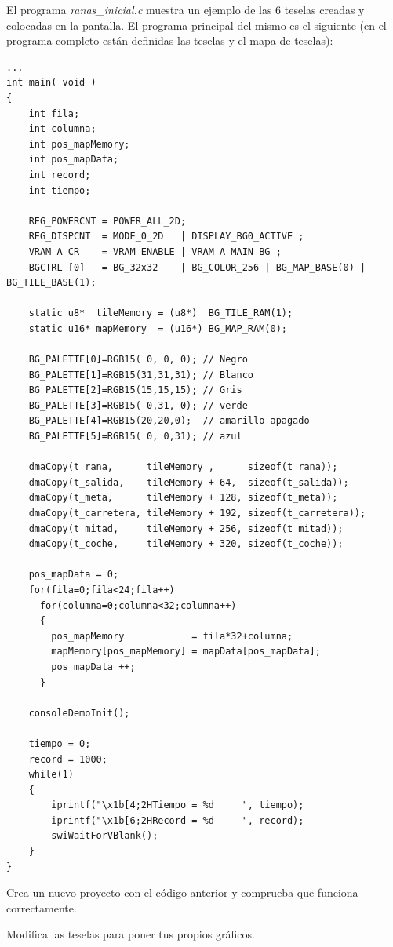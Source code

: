 \begin{example}
El programa \textit{ranas\_inicial.c} muestra un ejemplo de las 6 teselas creadas y colocadas en la pantalla. El programa principal del mismo es el siguiente (en el programa completo están definidas las teselas y el mapa de teselas):

\begin{lstlisting}
...
int main( void )
{
	int fila;
	int columna;
	int pos_mapMemory;
	int pos_mapData;
	int record;
	int tiempo;
	
	REG_POWERCNT = POWER_ALL_2D;
	REG_DISPCNT  = MODE_0_2D   | DISPLAY_BG0_ACTIVE ;
	VRAM_A_CR    = VRAM_ENABLE | VRAM_A_MAIN_BG ;
	BGCTRL [0]   = BG_32x32    | BG_COLOR_256 | BG_MAP_BASE(0) | BG_TILE_BASE(1);
	
	static u8*  tileMemory = (u8*)  BG_TILE_RAM(1);
	static u16* mapMemory  = (u16*) BG_MAP_RAM(0);
	
	BG_PALETTE[0]=RGB15( 0, 0, 0); // Negro
	BG_PALETTE[1]=RGB15(31,31,31); // Blanco
	BG_PALETTE[2]=RGB15(15,15,15); // Gris
	BG_PALETTE[3]=RGB15( 0,31, 0); // verde
	BG_PALETTE[4]=RGB15(20,20,0);  // amarillo apagado
	BG_PALETTE[5]=RGB15( 0, 0,31); // azul
	
	dmaCopy(t_rana,      tileMemory ,      sizeof(t_rana));
	dmaCopy(t_salida,    tileMemory + 64,  sizeof(t_salida));
	dmaCopy(t_meta,      tileMemory + 128, sizeof(t_meta));
	dmaCopy(t_carretera, tileMemory + 192, sizeof(t_carretera));
	dmaCopy(t_mitad,     tileMemory + 256, sizeof(t_mitad));
	dmaCopy(t_coche,     tileMemory + 320, sizeof(t_coche));
	
	pos_mapData = 0;
	for(fila=0;fila<24;fila++)
	  for(columna=0;columna<32;columna++)
      {
		pos_mapMemory            = fila*32+columna;
		mapMemory[pos_mapMemory] = mapData[pos_mapData];
		pos_mapData ++;
	  }
	
	consoleDemoInit();
	
	tiempo = 0;
	record = 1000;
	while(1)
	{
		iprintf("\x1b[4;2HTiempo = %d     ", tiempo);
		iprintf("\x1b[6;2HRecord = %d     ", record);
		swiWaitForVBlank();
	}
}
\end{lstlisting}
\end{example}

\begin{exercise}
	Crea un nuevo proyecto con el código anterior y comprueba que funciona correctamente.
\end{exercise}
	
\begin{exercise}
	Modifica las teselas para poner tus propios gráficos.
\end{exercise}
	
